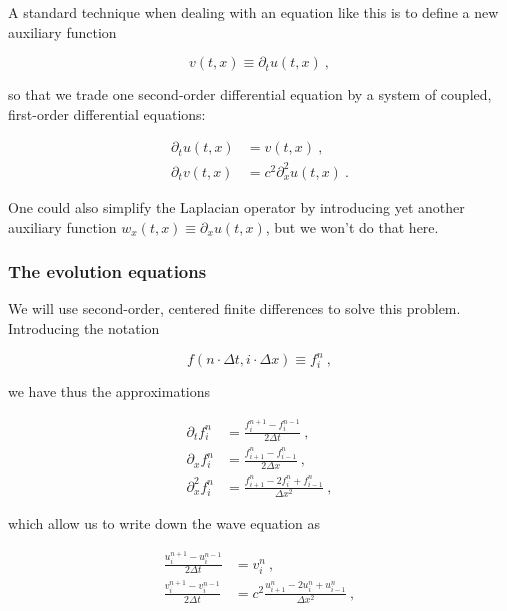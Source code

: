 \documentclass[a4paper,11pt]{article}
\begin{document}
A standard technique when dealing with an equation like this is to define a new auxiliary function

\begin{equation}
v(t,x) \equiv \partial_{t}u(t,x)\ ,
\end{equation}

\noindent so that we trade one second-order differential equation by a system of coupled, first-order differential equations:

\begin{equation}
\begin{aligned}
\partial_{t}u(t,x) &= v(t,x)\ ,\\
\partial_{t}v(t,x) &= c^{2}\partial_{x}^{2}u(t,x)\ .
\end{aligned}
\end{equation}

\noindent One could also simplify the Laplacian operator by introducing yet another auxiliary function $w_{x}(t,x)\equiv\partial_{x}u(t,x)$, but we won't do that here.

\subsubsection{The evolution equations}

We will use second-order, centered finite differences to solve this problem. Introducing the notation

\begin{equation}
f\left(n\cdot\Delta t,i\cdot\Delta x\right) \equiv f^{n}_{i}\ ,
\end{equation}

\noindent we have thus the approximations

\begin{equation}
\begin{aligned}
\partial_{t}f^{n}_{i}     &= \frac{f^{n+1}_{i}-f^{n-1}_{i}}{2\Delta t}           \ ,\\
\partial_{x}f^{n}_{i}     &= \frac{f^{n}_{i+1}-f^{n}_{i-1}}{2\Delta x}           \ ,\\
\partial_{x}^{2}f^{n}_{i} &= \frac{f^{n}_{i+1}-2f^{n}_{i}+f^{n}_{i-1}}{\Delta x^{2}}\ ,
\end{aligned}
\end{equation}

\noindent which allow us to write down the wave equation as

\begin{equation}
\begin{aligned}
\frac{u^{n+1}_{i}-u^{n-1}_{i}}{2\Delta t} &= v^{n}_{i}\ ,\\
\frac{v^{n+1}_{i}-v^{n-1}_{i}}{2\Delta t} &= c^{2}\frac{u^{n}_{i+1}-2u^{n}_{i}+u^{n}_{i-1}}{\Delta x^{2}}\ ,
\end{aligned}
\end{equation}
\end{document}
